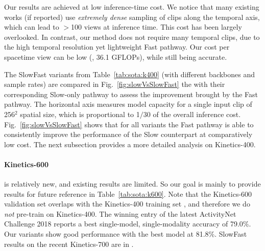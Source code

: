\documentclass[10pt,twocolumn,letterpaper]{article}
\newcommand{\figref}[1]{Fig.~\ref{#1}}
\newcommand{\tblref}[1]{Table~\ref{#1}}
\begin{document}

		Our results are achieved at low inference-time cost. We notice that many existing works (if reported) use \emph{extremely dense} sampling of clips along the temporal axis, which can lead to $>$100 views at inference time. This cost has been largely overlooked. In contrast, our method does not require many temporal clips, due to the high temporal resolution yet lightweight Fast pathway. Our cost per spacetime view can be low (\eg, 36.1 GFLOPs), while still being accurate. 
	
	The SlowFast variants from \tblref{tab:sota:k400} (with different backbones and sample rates) are compared in \figref{fig:slowVsSlowFast} the  with their corresponding Slow-only pathway to assess the improvement brought by the Fast pathway. The horizontal axis measures model capacity  for a single input clip of 256$^2$ spatial size, which is proportional to 1$/$30 of the overall inference cost. \figref{fig:slowVsSlowFast} shows that for all variants the Fast pathway is able to consistently improve the performance of the Slow counterpart at comparatively low cost. The next subsection provides a more detailed analysis on Kinetics-400.
	
	\paragraph{Kinetics-600} is relatively new, and existing results are limited. So our goal is mainly to provide results for future reference in  \tblref{tab:sota:k600}.  Note that the Kinetics-600 validation set overlaps with the Kinetics-400 training set \cite{Carreira2018}, and therefore we do \emph{not} pre-train on Kinetics-400. 
	The winning entry \cite{He2018} of the latest ActivityNet Challenge 2018 \cite{Ghanem2018} reports a best single-model, single-modality accuracy of 79.0\%. Our variants show good performance with the best model at 81.8\%. SlowFast results on the  recent Kinetics-700 \cite{Carreira2019} are in \cite{Feichtenhofer2019a}. %
	
\end{document}
